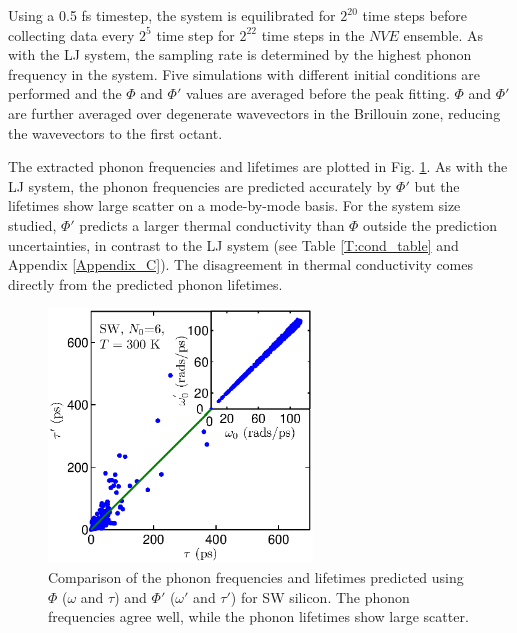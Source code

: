 \documentclass[aps,prb,preprint,superscriptaddress,amsmath,amssymb,floatfix]{revtex4}
\begin{document}
Using a 0.5 fs timestep, the system is equilibrated for $2^{20}$ time steps before collecting data every $2^5$ time step for $2^{22}$ time steps in the $NVE$ ensemble.\cite{mcquarrie2000} As with the LJ system, the sampling rate is determined by the highest phonon frequency in the system. Five simulations with different initial conditions are performed and the $\Phi$ and $\Phi'$ values are averaged before the peak fitting. $\Phi$ and $\Phi'$ are further averaged over degenerate wavevectors in the Brillouin zone, reducing the wavevectors to the first octant.\cite{mcgaugheythesis}

The extracted phonon frequencies and lifetimes are plotted in Fig$.$ \ref{F:FREQ_LIFE_Si}. As with the LJ system, the phonon frequencies are predicted accurately by $\Phi'$ but the lifetimes show large scatter on a mode-by-mode basis. For the system size studied, $\Phi'$ predicts a larger thermal conductivity than $\Phi$ outside the prediction uncertainties, in contrast to the LJ system (see Table \ref{T:cond_table} and Appendix \ref{Appendix_C}). The disagreement in thermal conductivity comes directly from the predicted phonon lifetimes.

\begin{figure}
\begin{center}
\includegraphics[angle=0,width=70.0mm]{Si_NMD_SED_redo.eps}
\vspace*{-5mm}
\end{center}
\caption{\label{F:FREQ_LIFE_Si} Comparison of the phonon frequencies and lifetimes predicted using $\Phi$ ($\omega$ and $\tau$) and  $\Phi'$ ($\omega'$ and $\tau'$) for SW silicon. The phonon frequencies agree well, while the phonon lifetimes show large scatter.}
\end{figure}

\vspace*{60mm}
\end{document}
